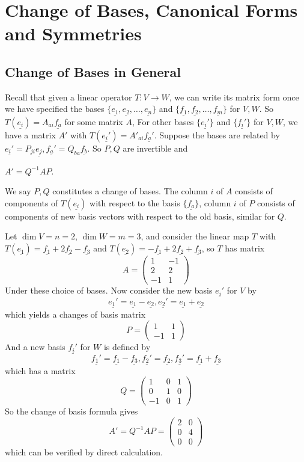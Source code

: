 \section{Change of Bases, Canonical Forms and Symmetries}
\subsection{Change of Bases in General}
Recall that given a linear operator $T:V\to W$, we can write its matrix form once we have specified the bases $\{\underline{e_1},\underline{e_2},\ldots,\underline{e_n}\}$ and $\{\underline{f_1},\underline{f_2},\ldots,\underline{f_m}\}$ for $V,W$.
So $T(\underline{e_i})=A_{ai}\underline{f_a}$ for some matrix $A$,
For other bases $\{\underline{e_i'}\}$ and $\{\underline{f_i'}\}$ for $V,W$, we have a matrix $A'$ with $T(\underline{e_i'})=A'_{ai}\underline{f_a'}$.
Suppose the bases are related by $\underline{e_i'}=P_{ji}\underline{e_j}, \underline{f_a'}=Q_{ba}\underline{f_b}$.
So $P,Q$ are invertible and
\begin{proposition}
    $A'=Q^{-1}AP$.
\end{proposition}
We say $P,Q$ constitutes a change of bases.
The column $i$ of $A$ consists of components of $T(\underline{e_i})$ with respect to the basis $\{\underline{f_a}\}$, column $i$ of $P$ consists of components of new basis vectors with respect to the old basis, similar for $Q$.
\begin{example}
    Let $\dim V=n=2$, $\dim W=m=3$, and consider the linear map $T$ with $T(\underline{e_1})=\underline{f_1}+2\underline{f_2}-\underline{f_3}$ and $T(\underline{e_2})=-\underline{f_1}+2\underline{f_2}+\underline{f_3}$, so $T$ has matrix
    $$A=\begin{pmatrix}
        1&-1\\
        2&2\\
        -1&1
    \end{pmatrix}$$
    Under these choice of bases.
    Now consider the new basis $\underline{e_i'}$ for $V$ by
    $$\underline{e_1'}=\underline{e_1}-\underline{e_2},\underline{e_2'}=\underline{e_1}+\underline{e_2}$$
    which yields a changes of basis matrix
    $$P=\begin{pmatrix}
        1&1\\
        -1&1
    \end{pmatrix}$$
    And a new basis $\underline{f_i'}$ for $W$ is defined by $$\underline{f_1'}=\underline{f_1}-\underline{f_3},\underline{f_2'}=\underline{f_2},\underline{f_3'}=\underline{f_1}+\underline{f_3}$$
    which has a matrix
    $$Q=\begin{pmatrix}
        1&0&1\\
        0&1&0\\
        -1&0&1
    \end{pmatrix}$$
    So the change of basis formula gives
    $$A'=Q^{-1}AP=\begin{pmatrix}
        2&0\\
        0&4\\
        0&0
    \end{pmatrix}$$
    which can be verified by direct calculation.
\end{example}
